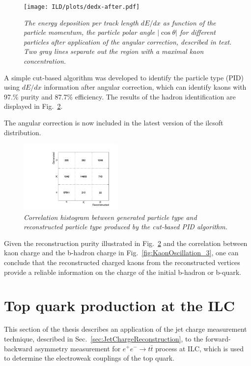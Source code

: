 \begin{figure}[h]
{\centering
    \texttt{[image: ILD/plots/dedx-after.pdf]}
    \caption{\sl The energy deposition per track length $dE/dx$ as function of the particle momentum, the particle polar angle $|\cos\theta|$ for different particles after application of the angular correction, described in text. Two gray lines separate out the region with a maximal kaon concentration. 
    }
    \label{fig:dEdxAfter_3}
  }
\end{figure}

A simple cut-based algorithm was developed to identify the particle type (PID) using $dE/dx$ information after angular correction, which can identify kaons with 97.\% purity and 87.7\% efficiency.
The results of the hadron identification are displayed in Fig.~\ref{fig:dEdxResults_3}.

The angular correction is now included in the latest version of the {\sc ilcsoft} distribution.

\begin{figure}[h]
{\centering
    \includegraphics[width=0.45\textwidth]{ILD/plots/dedx-results.pdf}
    \caption{\sl Correlation histogram between generated particle type and reconstructed particle type produced by the cut-based PID algorithm.
    }
    \label{fig:dEdxResults_3}
  }
 
\end{figure}


Given the reconstruction purity illustrated in Fig.~\ref{fig:dEdxResults_3} and the correlation between kaon charge and the b-hadron charge in Fig.~\ref{fig:KaonOscillation_3}, one can conclude that the reconstructed charged kaons from the reconstructed vertices provide a reliable information on the charge of the initial b-hadron or b-quark. 


\section{Top quark production at the ILC}
This section of the thesis describes an application of the jet charge measurement technique, described in Sec.~\ref{sec:JetChargeReconstruction}, to the forward-backward asymmetry measurement for $e^+e^- \to t\bar{t}$ process at ILC, which is used to determine the electroweak couplings of the top quark.

